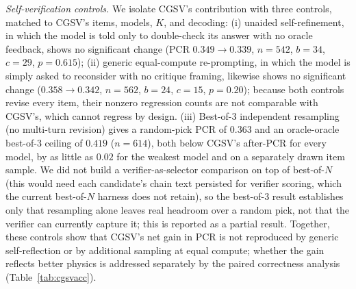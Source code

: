 \documentclass[pdflatex,sn-nature]{sn-jnl}
\newcommand{\rev}[1]{#1}
\newcommand{\rev}[1]{{\color{blue}#1}}
\begin{document}
\noindent\emph{Self-verification controls.} We isolate CGSV's contribution with three
controls, matched to CGSV's items, models, $K$, and decoding: (i) unaided
self-refinement, in which the model is told only to double-check its answer with no oracle
feedback, shows no significant change (PCR $0.349\to0.339$, $n=542$, $b=34$, $c=29$,
$p=0.615$); (ii) generic equal-compute re-prompting, in which the model is simply asked to
reconsider with no critique framing, likewise shows no significant change
($0.358\to0.342$, $n=562$, $b=24$, $c=15$, $p=0.20$)\rev{; because both controls revise every item, their
nonzero regression counts are not comparable with CGSV's, which cannot regress by design}. (iii) Best-of-3 independent resampling (no multi-turn revision) gives a
random-pick PCR of $0.363$ and an oracle-oracle best-of-3 ceiling of $0.419$ ($n=614$),
both below CGSV's after-PCR for every model, by as little as $0.02$ for the weakest model
and on a separately drawn item sample. We did not build a verifier-as-selector
comparison on top of best-of-$N$ (this would need each candidate's chain text persisted for
verifier scoring, which the current best-of-$N$ harness does not retain), so the
best-of-3 result establishes only that resampling alone leaves real headroom over a random
pick, not that the verifier can currently capture it; this is reported as a partial result. \rev{Together,
these controls show that CGSV's net gain in PCR is not reproduced by generic self-reflection or by
additional sampling at equal compute; whether the gain reflects better physics is addressed separately
by the paired correctness analysis (Table~\ref{tab:cgsvacc}).}
\end{document}
